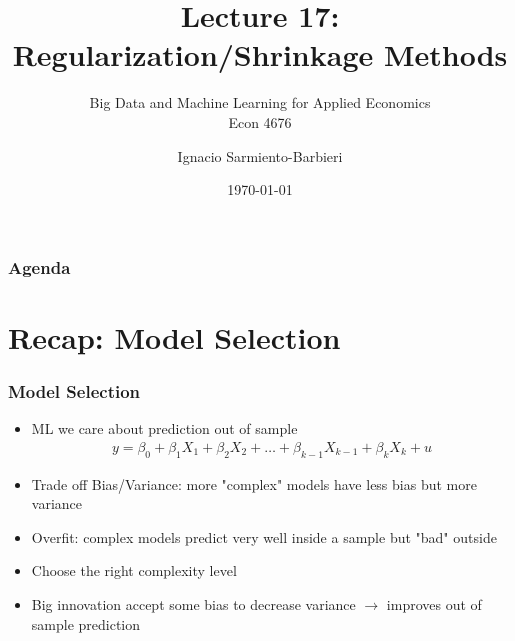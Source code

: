 \documentclass[
  shownotes,
  xcolor={svgnames},
  hyperref={colorlinks,citecolor=DarkBlue,linkcolor=DarkRed,urlcolor=DarkBlue}
  , aspectratio=169]{beamer}
\begin{document}
\title[Lecture 17]{Lecture 17: \\ Regularization/Shrinkage Methods}
\subtitle{Big Data and Machine Learning for Applied Economics \\ Econ 4676}
\date{\today}

\author[Sarmiento-Barbieri]{Ignacio Sarmiento-Barbieri}


\begin{frame}[noframenumbering]
\maketitle
\end{frame}





\begin{frame}
\frametitle{Agenda}

\tableofcontents

\end{frame}

\section{Recap: Model Selection}
\begin{frame}[fragile]
\frametitle{Model Selection}


\begin{itemize}
  \item ML we care about prediction out of sample
  \medskip
  \begin{align}
  y= \beta_0 + \beta_1 X_1 + \beta_2 X_2 + \dots + \beta_{k-1} X_{k-1} + \beta_k X_k + u 
  \end{align}
  \medskip
  \item Trade off Bias/Variance: more "complex" models have less bias but more variance
  \medskip
  \item Overfit: complex models predict very well inside a sample but "bad" outside
  \medskip
  \item Choose the right complexity level
  \medskip
  \item Big innovation accept some bias to decrease variance $\rightarrow$ improves out of sample prediction
\end{itemize}

\end{frame}
\end{document}
